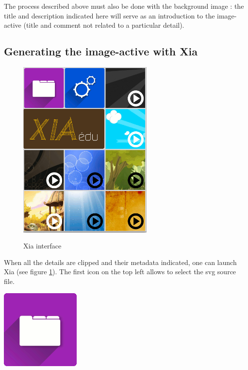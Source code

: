 The process described above must also be done with the background image : 
the title and description indicated here will serve as an introduction to 
the image-active (title and comment not related to a particular detail).

\subsection{Generating the image-active with Xia}

\begin{figure}[htp]
 \centering
 \caption{Xia interface}
 \includegraphics[width=0.6\textwidth]{./images/xia_vue_generale}
 \label{xia_interface}
\end{figure}

When all the details are clipped and their metadata indicated, one can launch 
Xia (see figure  
\ref{xia_interface}). The first icon on the top left allows 
to select the svg source file.

\begin{center}
\includegraphics[scale=0.4]{./images/xia_open} 
\end{center}

